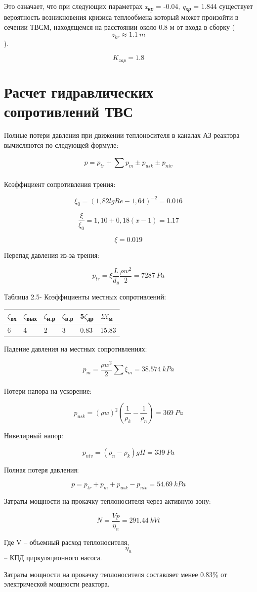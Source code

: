Это означает, что при следующих параметрах \emph{x\textsubscript{кр}} =
-0.04, \emph{q\textsubscript{кр}} = 1.844 существует вероятность
возникновения кризиса теплообмена который может произойти в сечении
ТВСМ, находящемся на расстоянии около 0.8 м от входа в сборку
(\[z_{kr} \approx 1.1\ m\]).

\[K_{zap} = 1.8\]

\section{Расчет гидравлических сопротивлений ТВС}

Полные потери давления при движении теплоносителя в каналах АЗ реактора
вычисляются по следующей формуле:

\[p = p_{tr} + \sum_{}^{}{p_{m} \pm p_{usk} \pm p_{niv}}\]

Коэффициент сопротивления трения:

\[\xi_{0} = {(1,82lgRe - 1,64)}^{- 2} = 0.016\]

\[\frac{\xi}{\xi_{0}} = 1,10 + 0,18\left( x - 1 \right) = 1.17\]

\[\xi = 0.019\]

Перепад давления из-за трения:

\[p_{tr} = \xi\frac{L}{d_{g}}\frac{\rho w^{2}}{2} = 7287\ Pa\]

Таблица 2.5- Коэффициенты местных сопротивлений:

\begin{longtable}[]{@{}llllll@{}}
\toprule
$\zeta$\textsubscript{вх} & $\zeta$\textsubscript{вых} & $\zeta$\textsubscript{н.р} &
$\zeta$\textsubscript{в.р} & 5$\zeta$\textsubscript{др} &
$\Sigma$$\zeta$\textsubscript{м}\tabularnewline
\midrule
\endhead
6 & 4 & 2 & 3 & 0.83 & 15.83\tabularnewline
\bottomrule
\end{longtable}

Падение давления на местных сопротивлениях:

\[p_{m} = \frac{\rho w^{2}}{2}\sum_{}^{}{\xi_{m} = 38.574\ kPa}\]

Потери напора на ускорение:

\[p_{usk} = \left( \rho w \right)^{2}\left( \frac{1}{\rho_{k}} - \frac{1}{\rho_{n}} \right) = 369\ Pa\]

Нивелирный напор:

\[p_{niv} = \left( \rho_{n} - \rho_{k} \right)gH = 339\ Pa\]

Полная потеря давления:

\[p = p_{tr} + p_{m} + p_{usk} - p_{niv} = 54.69\ kPa\]

Затраты мощности на прокачку теплоносителя через активную зону:

\[N = \frac{Vp}{\eta_{n}} = 291.44\ kVt\]

Где V -- объемный расход теплоносителя, \[\eta_{n}\] -- КПД
циркуляционного насоса.

Затраты мощности на прокачку теплоносителя составляет менее 0.83\% от
электрической мощности реактора.
